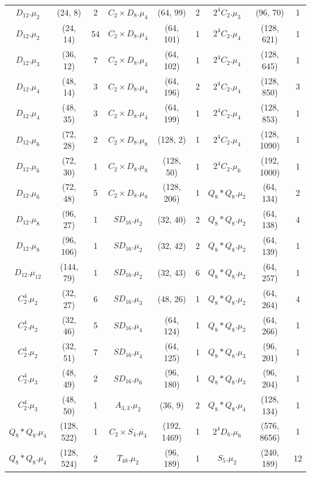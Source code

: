 {\begin{longtable}{ccc|ccc|ccc}
\rowcolor{lightgray}
$D_{12}.\mu_{2}$&(24, 8)&2 & $C_2 \times D_8.\mu_{4}$&(64, 99)&2 & $2^4C_2.\mu_{3}$&(96, 70)&1\\
$D_{12}.\mu_{2}$&(24, 14)&54 & $C_2 \times D_8.\mu_{4}$&(64, 101)&1 & $2^4C_2.\mu_{4}$&(128, 621)&1\\
\rowcolor{lightgray}
$D_{12}.\mu_{3}$&(36, 12)&7 & $C_2 \times D_8.\mu_{4}$&(64, 102)&1 & $2^4C_2.\mu_{4}$&(128, 645)&1\\
$D_{12}.\mu_{4}$&(48, 14)&3 & $C_2 \times D_8.\mu_{4}$&(64, 196)&2 & $2^4C_2.\mu_{4}$&(128, 850)&3\\
\rowcolor{lightgray}
 $D_{12}.\mu_{4}$&(48, 35)&3 & $C_2 \times D_8.\mu_{4}$&(64, 199)&1 & $2^4C_2.\mu_{4}$&(128, 853)&1\\
$D_{12}.\mu_{6}$&(72, 28)&2 & $C_2 \times D_8.\mu_{8}$&(128, 2)&1 & $2^4C_2.\mu_{4}$&(128, 1090)&1\\
\rowcolor{lightgray}
$D_{12}.\mu_{6}$&(72, 30)&1 & $C_2 \times D_8.\mu_{8}$&(128, 50)&1 & $2^4C_2.\mu_{6}$&(192, 1000)&1\\
$D_{12}.\mu_{6}$&(72, 48)&5 & $C_2 \times D_8.\mu_{8}$&(128, 206)&1 & $Q_8 * Q_8.\mu_{2}$&(64, 134)&2\\
\rowcolor{lightgray}
$D_{12}.\mu_{8}$&(96, 27)&1 & $SD_{16}.\mu_{2}$&(32, 40)&2 & $Q_8 * Q_8.\mu_{2}$&(64, 138)&4\\
$D_{12}.\mu_{8}$&(96, 106)&1 & $SD_{16}.\mu_{2}$&(32, 42)&2 & $Q_8 * Q_8.\mu_{2}$&(64, 139)&1\\
\rowcolor{lightgray}
$D_{12}.\mu_{12}$&(144, 79)&1 & $SD_{16}.\mu_{2}$&(32, 43)&6 & $Q_8 * Q_8.\mu_{2}$&(64, 257)&1\\
$C_2^4.\mu_{2}$&(32, 27)&6 & $SD_{16}.\mu_{3}$&(48, 26)&1 & $Q_8 * Q_8.\mu_{2}$&(64, 264)&4\\
\rowcolor{lightgray}
$C_2^4.\mu_{2}$&(32, 46)&5 & $SD_{16}.\mu_{4}$&(64, 124)&1 & $Q_8 * Q_8.\mu_{2}$&(64, 266)&1\\
$C_2^4.\mu_{2}$&(32, 51)&7 & $SD_{16}.\mu_{4}$&(64, 125)&1 & $Q_8 * Q_8.\mu_{3}$&(96, 201)&1\\
\rowcolor{lightgray}
$C_2^4.\mu_{3}$&(48, 49)&2 & $SD_{16}.\mu_{6}$&(96, 180)&1 & $Q_8 * Q_8.\mu_{3}$&(96, 204)&1\\
$C_2^4.\mu_{3}$&(48, 50)&1 & $A_{3,3}.\mu_{2}$&(36, 9)&2 & $Q_8 * Q_8.\mu_{4}$&(128, 134)&1\\
\rowcolor{lightgray}
$Q_8 * Q_8.\mu_{4}$&(128, 522)&1 & $C_2 \times S_4.\mu_{4}$&(192, 1469)&1 & $2^4D_6.\mu_{6}$&(576, 8656)&1\\
$Q_8 * Q_8.\mu_{4}$&(128, 524)&2 & $T_{48}.\mu_{2}$&(96, 189)&1 & $S_5.\mu_{2}$&(240, 189)&12\\

\end{longtable}}
